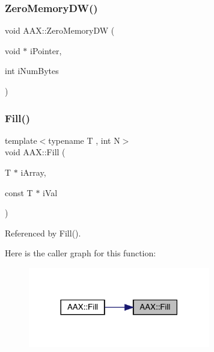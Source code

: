 \mbox{\label{a00852_a0e598e79488a12354e9dbc340fa99b5a}} 
\subsubsection{\texorpdfstring{ZeroMemoryDW()}{ZeroMemoryDW()}}
{\footnotesize\ttfamily void A\+A\+X\+::\+Zero\+Memory\+DW (\begin{DoxyParamCaption}\item[{void $\ast$}]{i\+Pointer,  }\item[{int}]{i\+Num\+Bytes }\end{DoxyParamCaption})\hspace{0.3cm}{\ttfamily [inline]}}

\mbox{\label{a00852_a1e72222769ecdf34fa73ae38c0c709df}} 
\subsubsection{\texorpdfstring{Fill()}{Fill()}\hspace{0.1cm}{\footnotesize\ttfamily [1/3]}}
{\footnotesize\ttfamily template$<$typename T , int N$>$ \\
void A\+A\+X\+::\+Fill (\begin{DoxyParamCaption}\item[{T $\ast$}]{i\+Array,  }\item[{const T $\ast$}]{i\+Val }\end{DoxyParamCaption})}



Referenced by Fill().

Here is the caller graph for this function\+:
\nopagebreak
\begin{figure}[H]
\begin{center}
\leavevmode
\includegraphics[width=225pt]{a00852_a1e72222769ecdf34fa73ae38c0c709df_icgraph}
\end{center}
\end{figure}
\mbox{\label{a00852_a480beff32ac0847c665f735fd8f78c0a}} 
